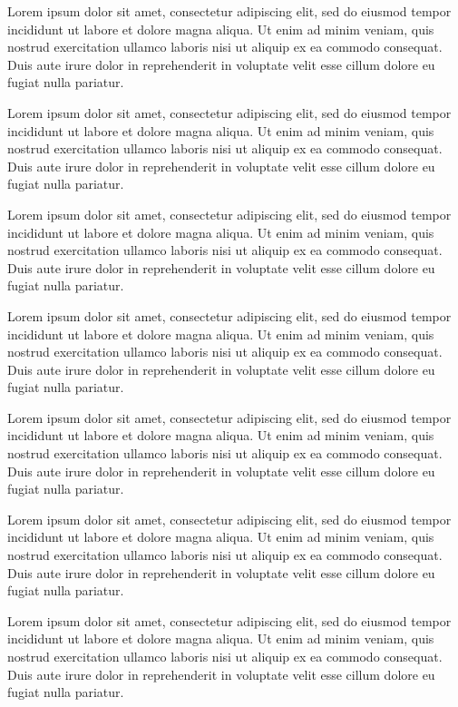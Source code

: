 \documentclass{article}
\begin{document}
Lorem ipsum dolor sit amet, consectetur adipiscing elit, sed do eiusmod tempor incididunt ut labore et dolore magna aliqua. Ut enim ad minim veniam, quis nostrud exercitation ullamco laboris nisi ut aliquip ex ea commodo consequat. Duis aute irure dolor in reprehenderit in voluptate velit esse cillum dolore eu fugiat nulla pariatur.

Lorem ipsum dolor sit amet, consectetur adipiscing elit, sed do eiusmod tempor incididunt ut labore et dolore magna aliqua. Ut enim ad minim veniam, quis nostrud exercitation ullamco laboris nisi ut aliquip ex ea commodo consequat. Duis aute irure dolor in reprehenderit in voluptate velit esse cillum dolore eu fugiat nulla pariatur.

Lorem ipsum dolor sit amet, consectetur adipiscing elit, sed do eiusmod tempor incididunt ut labore et dolore magna aliqua. Ut enim ad minim veniam, quis nostrud exercitation ullamco laboris nisi ut aliquip ex ea commodo consequat. Duis aute irure dolor in reprehenderit in voluptate velit esse cillum dolore eu fugiat nulla pariatur.

Lorem ipsum dolor sit amet, consectetur adipiscing elit, sed do eiusmod tempor incididunt ut labore et dolore magna aliqua. Ut enim ad minim veniam, quis nostrud exercitation ullamco laboris nisi ut aliquip ex ea commodo consequat. Duis aute irure dolor in reprehenderit in voluptate velit esse cillum dolore eu fugiat nulla pariatur.

Lorem ipsum dolor sit amet, consectetur adipiscing elit, sed do eiusmod tempor incididunt ut labore et dolore magna aliqua. Ut enim ad minim veniam, quis nostrud exercitation ullamco laboris nisi ut aliquip ex ea commodo consequat. Duis aute irure dolor in reprehenderit in voluptate velit esse cillum dolore eu fugiat nulla pariatur.

Lorem ipsum dolor sit amet, consectetur adipiscing elit, sed do eiusmod tempor incididunt ut labore et dolore magna aliqua. Ut enim ad minim veniam, quis nostrud exercitation ullamco laboris nisi ut aliquip ex ea commodo consequat. Duis aute irure dolor in reprehenderit in voluptate velit esse cillum dolore eu fugiat nulla pariatur.

Lorem ipsum dolor sit amet, consectetur adipiscing elit, sed do eiusmod tempor incididunt ut labore et dolore magna aliqua. Ut enim ad minim veniam, quis nostrud exercitation ullamco laboris nisi ut aliquip ex ea commodo consequat. Duis aute irure dolor in reprehenderit in voluptate velit esse cillum dolore eu fugiat nulla pariatur.
\end{document}
